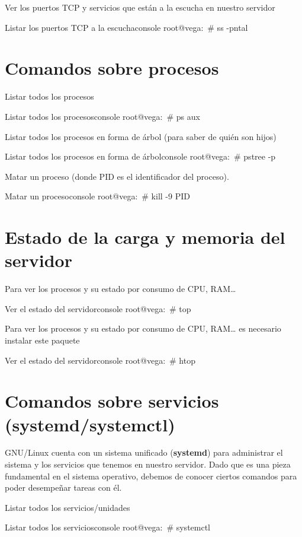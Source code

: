 Ver los puertos TCP y servicios que están a la escucha en nuestro servidor
\begin{mycode}{Listar los puertos TCP a la escucha}{console}{}
root@vega:~# ss -pntal
\end{mycode}

\section{Comandos sobre procesos}
Listar todos los procesos
\begin{mycode}{Listar todos los procesos}{console}{}
root@vega:~# ps aux
\end{mycode}

Listar todos los procesos en forma de árbol (para saber de quién son hijos)
\begin{mycode}{Listar todos los procesos en forma de árbol}{console}{}
root@vega:~# pstree -p
\end{mycode}

Matar un proceso (donde PID es el identificador del proceso).
\begin{mycode}{Matar un proceso}{console}{}
root@vega:~# kill -9 PID
\end{mycode}

\section{Estado de la carga y memoria del servidor}
Para ver los procesos y su estado por consumo de CPU, RAM…
\begin{mycode}{Ver el estado del servidor}{console}{}
root@vega:~# top
\end{mycode}

Para ver los procesos y su estado por consumo de CPU, RAM… es necesario instalar este paquete
\begin{mycode}{Ver el estado del servidor}{console}{}
root@vega:~# htop
\end{mycode}

\section{Comandos sobre servicios (systemd/systemctl)}
GNU/Linux cuenta con un sistema unificado (\textbf{systemd}) para administrar el sistema y los servicios que tenemos en nuestro servidor. Dado que es una pieza fundamental en el sistema operativo, debemos de conocer ciertos comandos para poder desempeñar tareas con él.

Listar todos los servicios/unidades
\begin{mycode}{Listar todos los servicios}{console}{}
root@vega:~# systemctl
\end{mycode}

